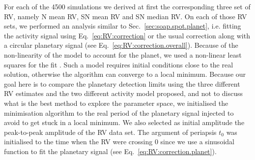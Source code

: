 \documentclass{aa}
\begin{document}
For each of the 4500 simulations we derived at first the corresponding three set of RV, namely N mean RV, SN mean RV and SN median RV. 
On each of those RV sets, we performed an analysis similar to Sec.~\ref{sec:soap.spot.planet}, i.e. fitting the activity signal using Eq.~\eqref{eq:RV:correction}
or the usual correction along with a circular planetary signal (see Eq.~\eqref{eq:RV:correction.overall}). Because of the non-linearity of the model to account for the
planet, we used a non-linear least squares for the fit \citep[][]{levenberg1944method,marquardt1963algorithm,teunissen1990nonlinear}. Such a model requires
initial conditions close to the real solution, otherwise the algorithm can converge to a local minimum. Because our goal here is to compare the planetary detection limits
using the three different RV estimates and the two different activity model proposed, and not to discuss what is the best method to explore the parameter space, we 
initialised the minimisation algorithm to the real period of the planetary signal injected to avoid to get stuck in a local minimum. We also selected as initial amplitude the peak-to-peak amplitude of the RV data set.
The argument of periapsis $t_0$ was initialised to the time when the RV were crossing 0 since we use a sinusoidal function to fit the planetary signal (see Eq.~\eqref{eq:RV:correction.planet}).
\end{document}
